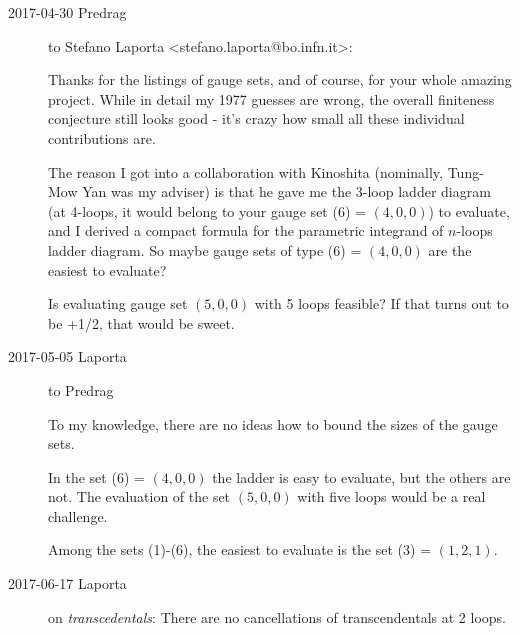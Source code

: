 
\begin{description}

\item[2017-04-30 Predrag] to
Stefano Laporta <stefano.laporta@bo.infn.it>:

Thanks for the listings of gauge sets, and of course, for your whole amazing
project. While in detail my 1977 guesses are wrong, the overall finiteness conjecture
still looks good - it's crazy how small all these individual contributions are.

The reason I got into a collaboration with Kinoshita (nominally, Tung-Mow
Yan was my adviser) is that he gave me the 3-loop ladder diagram (at
4-loops, it would belong to your gauge set (6) = $(4,0,0)$) to evaluate,
and I derived a compact formula for the parametric integrand of $n$-loops
ladder diagram. So maybe gauge sets of type (6) = $(4,0,0)$ are the
easiest to evaluate?

Is evaluating gauge set $(5,0,0)$ with 5 loops feasible? If that turns out to be
+1/2, that would be sweet.

\item[2017-05-05 Laporta] to Predrag

To my knowledge, there are no ideas how to bound the sizes of the gauge sets.

In the set (6) = $(4,0,0)$ the ladder is easy to evaluate, but the others are not.
The evaluation of the set $(5,0,0)$ with five loops would be a real challenge.

Among the sets (1)-(6), the easiest to evaluate is the set (3) = $(1,2,1)$.

\item[2017-06-17 Laporta] on \emph{transcedentals}:
There are no cancellations of transcendentals at 2 loops.


\end{description}
